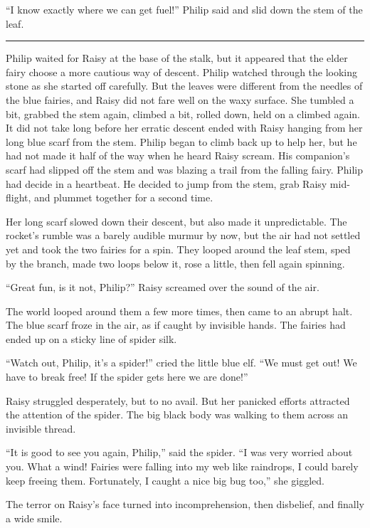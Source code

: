 \documentclass[10pt, draft]{memoir}
\renewcommand{\pfbreakdisplay}{\bigskip \ding{166} \bigskip}
\newcommand{\secbreak}{\fancybreak{\pfbreakdisplay}}
\begin{document}
``I know exactly where we can get fuel!'' Philip said and slid down the stem of
the leaf.

\secbreak

Philip waited for Raisy at the base of the stalk, but it appeared that the
elder fairy choose a more cautious way of descent. Philip watched through the
looking stone as she started off carefully. But the leaves were different from
the needles of the blue fairies, and Raisy did not fare well on the waxy
surface. She tumbled a bit, grabbed the stem again, climbed a bit, rolled down,
held on a climbed again. It did not take long before her erratic descent ended
with Raisy hanging from her long blue scarf from the stem. Philip began to
climb back up to help her, but he had not made it half of the way when he heard
Raisy scream. His companion's scarf had slipped off the stem and was blazing a
trail from the falling fairy. Philip had decide in a heartbeat. He decided to
jump from the stem, grab Raisy mid-flight, and plummet together for a second
time.

Her long scarf slowed down their descent, but also made it unpredictable. The
rocket's rumble was a barely audible murmur by now, but the air had not settled
yet and took the two fairies for a spin. They looped around the leaf stem, sped
by the branch, made two loops below it, rose a little, then fell again
spinning.

``Great fun, is it not, Philip?'' Raisy screamed over the sound of the air.

The world looped around them a few more times, then came to an abrupt halt. The
blue scarf froze in the air, as if caught by invisible hands. The fairies had
ended up on a sticky line of spider silk.

``Watch out, Philip, it's a spider!'' cried the little blue elf. ``We must get
out! We have to break free! If the spider gets here we are done!''

Raisy struggled desperately, but to no avail. But her panicked efforts
attracted the attention of the spider. The big black body was walking to them
across an invisible thread.

``It is good to see you again, Philip,'' said the spider. ``I was very worried
about you. What a wind! Fairies were falling into my web like raindrops, I
could barely keep freeing them. Fortunately, I caught a nice big bug too,'' she
giggled.

The terror on Raisy's face turned into incomprehension, then disbelief, and
finally a wide smile.
\end{document}
